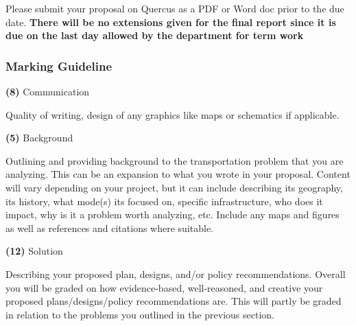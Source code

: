 \documentclass[11pt]{article}
\begin{document}
	Please submit your proposal on Quercus as a PDF or Word doc prior to the due date. \textbf{There will be no extensions given for the final report since it is due on the last day allowed by the department for term work}
	
	
	
	
	
	

	\subsubsection*{Marking Guideline}
	
	\textbf{(8)} Communication 
	
	Quality of writing, design of any graphics like maps or schematics if applicable.
	
	\textbf{(5)} Background 
	
	Outlining and providing background to the transportation problem that you are analyzing. This can be an expansion to what you wrote in your proposal. Content will vary depending on your project, but it can include describing its geography, its history, what mode(s) its focused on, specific infrastructure, who does it impact, why is it a problem worth analyzing, etc. Include any maps and figures as well as references and citations where suitable.
	
	\textbf{(12)} Solution 
	
	Describing your proposed plan, designs, and/or policy recommendations. Overall you will be graded on how evidence-based, well-reasoned, and creative your proposed plans/designs/policy recommendations are. This will partly be graded in relation to the problems you outlined in the previous section. 
	
	\vspace{5mm}
	
	
	
	
\end{document}
